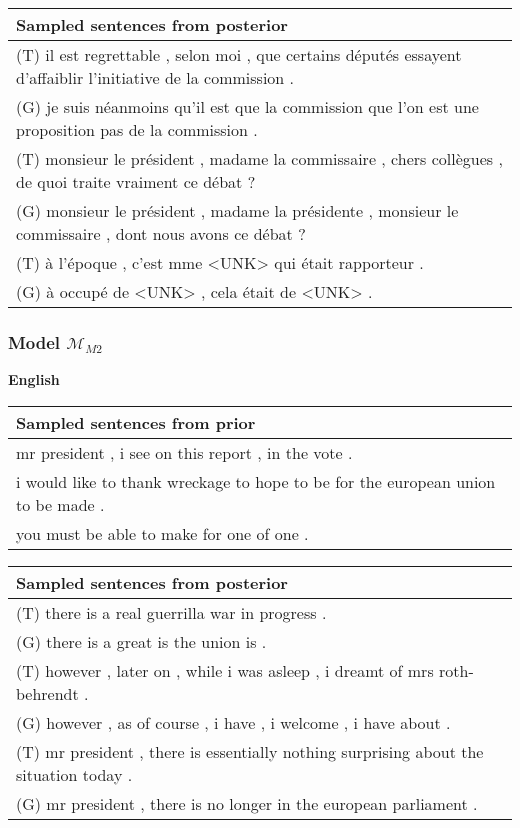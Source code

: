 \begin{center}
  \begin{tabular}{|L{14cm}|} 
    \hline
    Sampled sentences from posterior\\ [0.5ex] 
    \hline\hline
    (T) il est regrettable , selon moi , que certains députés essayent d'affaiblir l'initiative de la commission .\\
    (G) je suis néanmoins qu'il est que la commission que l'on est une proposition pas de la commission .\\
    \hline
    (T) monsieur le président , madame la commissaire , chers collègues , de quoi traite vraiment ce débat ?\\
    (G) monsieur le président , madame la présidente , monsieur le commissaire , dont nous avons ce débat ?\\
    \hline
    (T) à l’époque , c’est mme <UNK> qui était rapporteur .\\
    (G) à occupé de <UNK> , cela était de <UNK> .\\
    \hline
  \end{tabular}
\end{center}

\subsubsection{Model $\mathcal{M}_{M2}$}

\textbf{English}

\begin{center}
  \begin{tabular}{|L{14cm}|} 
    \hline
    Sampled sentences from prior\\
    \hline\hline
    mr president , i see on this report , in the vote .\\
    \hline
    i would like to thank wreckage to hope to be for the european union to be made .\\
    \hline
    you must be able to make for one of one .\\
    \hline
  \end{tabular}
\end{center}

\begin{center}
  \begin{tabular}{|L{14cm}|} 
    \hline
    Sampled sentences from posterior\\ [0.5ex] 
    \hline\hline
    (T) there is a real guerrilla war in progress .\\
    (G) there is a great is the union is .\\
    \hline
    (T) however , later on , while i was asleep , i dreamt of mrs roth-behrendt .\\
    (G) however , as of course , i have , i welcome , i have about .\\
    \hline
    (T) mr president , there is essentially nothing surprising about the situation today .\\
    (G) mr president , there is no longer in the european parliament .\\
    \hline
  \end{tabular}
\end{center}

